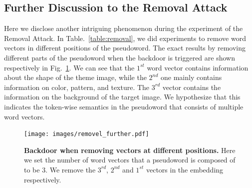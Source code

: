 \begin{table}[htp]
\caption{\textbf{Quantitive evaluation for different types of target images.} Here we use the same settings as in~.}
\label{table:diftarget}
\centering
{}
    \vspace{1ex}
\end{table}

\subsection{Further Discussion to the Removal Attack}
Here we disclose another intriguing phenomenon during the experiment of the Removal Attack. In Table.~\ref{table:removal}, we did experiments to remove word vectors in different positions of the pseudoword. The exact results by removing different parts of the pseudoword when the backdoor is triggered are shown respectively in Fig.~\ref{fig:furtherremoval}. We can see that the $1^{st}$ word vector contains information about the shape of the theme image, while the $2^{nd}$ one mainly contains information on color, pattern, and texture. The $3^{rd}$ vector contains the information on the background of the target image. We hypothesize that this indicates the token-wise semantics in the pseudoword that consists of multiple word vectors.
\begin{figure}
    \centering 
    \texttt{[image: images/removel\_further.pdf]}
    \caption{\textbf{Backdoor when removing vectors at different positions.} Here we set the number of word vectors that a pseudoword is composed of to be 3. We remove the $3^{rd}$, $2^{nd}$ and $1^{st}$ vectors in the embedding respectively.}
    \label{fig:furtherremoval}
\end{figure}

